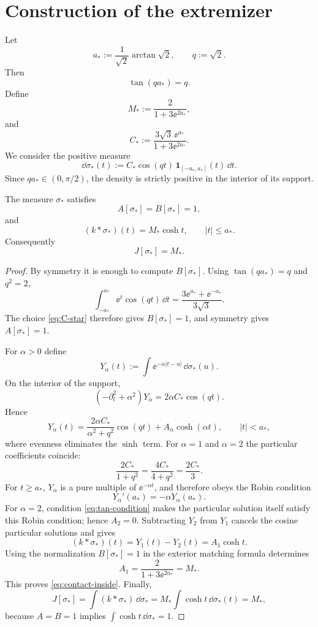 \section{Construction of the extremizer}\label{sec:extremizer}

Let
\[
 a_*:=\frac1{\sqrt2}\arctan\sqrt2,
 \qquad q:=\sqrt2.
\]
Then
\begin{equation}\label{eq:tan-condition}
 \tan(q a_*)=q.
\end{equation}
Define
\[
 M_*:=\frac{2}{1+3\ee^{2a_*}},
\]
and
\begin{equation}\label{eq:C-star}
 C_*:=\frac{3\sqrt3\,\ee^{a_*}}{1+3\ee^{2a_*}}.
\end{equation}
We consider the positive measure
\[
 \dd\sigma_*(t)
 :=C_*\cos(qt)\,\mathbf 1_{[-a_*,a_*]}(t)\,\dd t.
\]
Since $qa_*\in(0,\pi/2)$, the density is strictly positive in the interior of its support.

\begin{proposition}\label{prop:candidate}
The measure $\sigma_*$ satisfies
\[
 A[\sigma_*]=B[\sigma_*]=1,
\]
and
\begin{equation}\label{eq:contact-inside}
 (k*\sigma_*)(t)=M_*\cosh t,
 \qquad |t|\le a_*.
\end{equation}
Consequently
\[
 J[\sigma_*]=M_*.
\]
\end{proposition}

\begin{proof}
By symmetry it is enough to compute $B[\sigma_*]$.  Using $\tan(qa_*)=q$ and $q^2=2$,
\[
 \int_{-a_*}^{a_*}\ee^t\cos(qt)\,\dd t
 =\frac{3\ee^{a_*}+\ee^{-a_*}}{3\sqrt3}.
\]
The choice \eqref{eq:C-star} therefore gives $B[\sigma_*]=1$, and symmetry gives $A[\sigma_*]=1$.

For $\alpha>0$ define
\[
 Y_\alpha(t):=\int\ee^{-\alpha|t-u|}\,\dd\sigma_*(u).
\]
On the interior of the support,
\[
 (-\partial_t^2+\alpha^2)Y_\alpha
 =2\alpha C_*\cos(qt).
\]
Hence
\[
 Y_\alpha(t)
 =\frac{2\alpha C_*}{\alpha^2+q^2}\cos(qt)
 +A_\alpha\cosh(\alpha t),
 \qquad |t|<a_*,
\]
where evenness eliminates the $\sinh$ term.  For $\alpha=1$ and $\alpha=2$ the particular coefficients coincide:
\[
 \frac{2C_*}{1+q^2}
 =\frac{4C_*}{4+q^2}
 =\frac{2C_*}{3}.
\]
For $t\ge a_*$, $Y_\alpha$ is a pure multiple of $\ee^{-\alpha t}$, and therefore obeys the Robin condition
\[
 Y_\alpha'(a_*)=-\alpha Y_\alpha(a_*).
\]
For $\alpha=2$, condition \eqref{eq:tan-condition} makes the particular solution itself satisfy this Robin condition; hence $A_2=0$.  Subtracting $Y_2$ from $Y_1$ cancels the cosine particular solutions and gives
\[
 (k*\sigma_*)(t)=Y_1(t)-Y_2(t)=A_1\cosh t.
\]
Using the normalization $B[\sigma_*]=1$ in the exterior matching formula determines
\[
 A_1=\frac{2}{1+3\ee^{2a_*}}=M_*.
\]
This proves \eqref{eq:contact-inside}.  Finally,
\[
 J[\sigma_*]
 =\int(k*\sigma_*)\,\dd\sigma_*
 =M_*\int\cosh t\,\dd\sigma_*(t)
 =M_*,
\]
because $A=B=1$ implies $\int\cosh t\,\dd\sigma_*=1$.
\end{proof}

